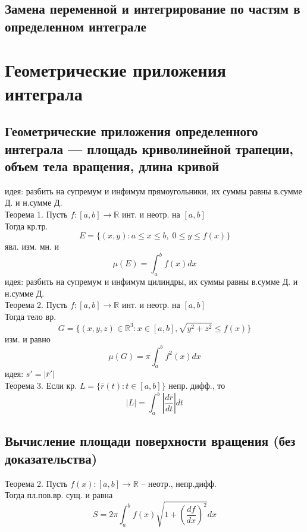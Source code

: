 \documentclass{article}
\begin{document}
\subsection{Замена переменной и интегрирование по частям в определенном интеграле}


\section{Геометрические приложения интеграла}
\subsection{Геометрические приложения определенного интеграла — площадь криволинейной трапеции, объем тела вращения, длина кривой}
идея: разбить на супремум и инфимум прямоугольники, их суммы равны в.сумме Д. и н.сумме Д. \\
Теорема 1. Пусть $f:[a,b] \rightarrow \mathbb R$ инт. и неотр. на $[a,b]$ \\
Тогда кр.тр. 
\begin{equation*}
    E = \{ (x,y): a \leq x \leq b, \; 0 \leq y \leq f(x) \}
\end{equation*}
явл. изм. мн. и
\begin{equation*}
    \mu (E) = \int_a^b f(x) dx
\end{equation*}
идея: разбить на супремум и инфимум цилиндры, их суммы равны в.сумме Д. и н.сумме Д. \\
Теорема 2. Пусть $f:[a,b]\rightarrow\mathbb R$ инт. и неотр. на $[a,b]$ \\
Тогда тело вр.
\begin{equation*}
    G = \{ (x,y,z) \in \mathbb R^3: x \in [a,b], \sqrt{y^2+z^2} \leq f(x) \}
\end{equation*}
изм. и равно
\begin{equation*}
    \mu(G) = \pi \int_a^b f^2(x) dx
\end{equation*}
идея: $s' = |\overline{r}'|$ \\
Теорема 3. Если кр. $L = \{ \overline{r}(t): t \in [a,b] \}$ непр. дифф., то
\begin{equation*}
    |L| = \int_a^b |\frac{d\overline{r}}{dt}| dt
\end{equation*}
\subsection{Вычисление площади поверхности вращения (без
доказательства)}
Теорема 2. Пусть $f(x): [a,b] \rightarrow \mathbb R$ -- неотр., непр.дифф. \\
Тогда пл.пов.вр. сущ. и равна
\begin{equation*}
    S = 2\pi \int_a^b f(x) \sqrt{1+(\frac{df}{dx})^2}dx
\end{equation*}
\end{document}
